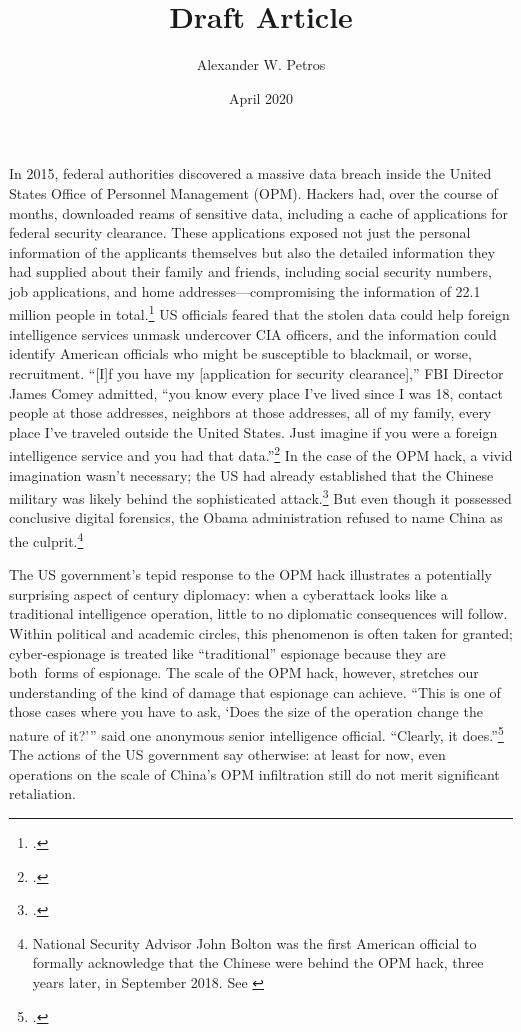 \documentclass[14pt]{extarticle}
\title{Draft Article}
\author{Alexander W. Petros}
\date{April 2020}
\begin{document}
\maketitle

In 2015, federal authorities discovered a massive data breach inside the United States Office of Personnel Management (OPM). Hackers had, over the course of months, downloaded reams of sensitive data, including a cache of applications for federal security clearance. These applications exposed not just the personal information of the applicants themselves but also the detailed information they had supplied about their family and friends, including social security numbers, job applications, and home addresses---compromising the information of 22.1 million people in total.\footcite{nakashima_hacks_2015} US officials feared that the stolen data could help foreign intelligence services unmask undercover CIA officers, and the information could identify American officials who might be susceptible to blackmail, or worse, recruitment. \enquote{[I]f you have my [application for security clearance],} FBI Director James Comey admitted, ``you know every place I've lived since I was 18, contact people at those addresses, neighbors at those addresses, all of my family, every place I've traveled outside the United States. Just imagine if you were a foreign intelligence service and you had that data.''\footcite{nakashima_hacks_2015} In the case of the OPM hack, a vivid imagination wasn't necessary; the US had already established that the Chinese military was likely behind the sophisticated attack.\footcite{koerner_inside_2016} But even though it possessed conclusive digital forensics, the Obama administration refused to name China as the culprit.\footnote{National Security Advisor John Bolton was the first American official to formally acknowledge that the Chinese were behind the OPM hack, three years later, in September 2018. See \cite{sanger_trump_2018}}

The US government's tepid response to the OPM hack illustrates a potentially surprising aspect of  century diplomacy: when a cyberattack looks like a traditional intelligence operation, little to no diplomatic consequences will follow. Within political and academic circles, this phenomenon is often taken for granted; cyber-espionage is treated like \enquote{traditional} espionage because they are both forms of espionage. The scale of the OPM hack, however, stretches our understanding of the kind of damage that espionage can achieve. ``This is one of those cases where you have to ask, `Does the size of the operation change the nature of it?'\thinspace'' said one anonymous senior intelligence official. \enquote{Clearly, it does.}\footcite{sanger_u.s._2015} The actions of the US government say otherwise: at least for now, even operations on the scale of China's OPM infiltration still do not merit significant retaliation.
\end{document}

